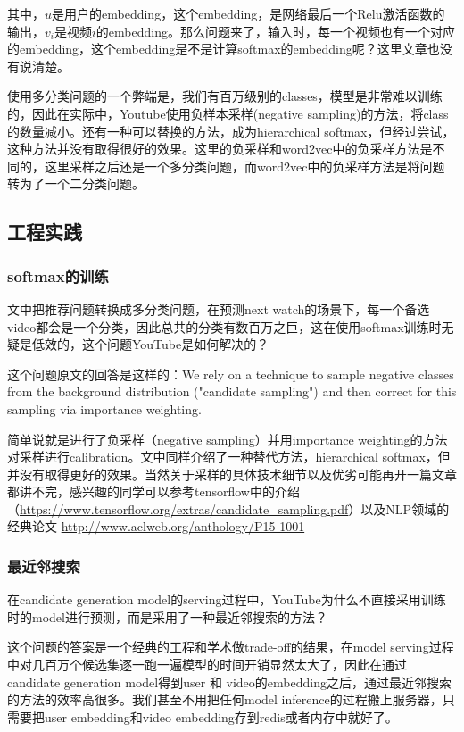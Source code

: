 \documentclass[12pt]{article}
\begin{document}
其中，$u$是用户的embedding，这个embedding，是网络最后一个Relu激活函数的输出，$v_i$是视频$i$的embedding。那么问题来了，输入时，每一个视频也有一个对应的embedding，这个embedding是不是计算softmax的embedding呢？这里文章也没有说清楚。

使用多分类问题的一个弊端是，我们有百万级别的classes，模型是非常难以训练的，因此在实际中，Youtube使用负样本采样(negative sampling)的方法，将class的数量减小。还有一种可以替换的方法，成为hierarchical softmax，但经过尝试，这种方法并没有取得很好的效果。这里的负采样和word2vec中的负采样方法是不同的，这里采样之后还是一个多分类问题，而word2vec中的负采样方法是将问题转为了一个二分类问题。

\subsection{工程实践}
\subsubsection{softmax的训练}
文中把推荐问题转换成多分类问题，在预测next watch的场景下，每一个备选video都会是一个分类，因此总共的分类有数百万之巨，这在使用softmax训练时无疑是低效的，这个问题YouTube是如何解决的？

这个问题原文的回答是这样的：We rely on a technique to sample negative classes from the background distribution ("candidate sampling") and then correct for this sampling via importance weighting.

简单说就是进行了负采样（negative sampling）并用importance weighting的方法对采样进行calibration。文中同样介绍了一种替代方法，hierarchical softmax，但并没有取得更好的效果。当然关于采样的具体技术细节以及优劣可能再开一篇文章都讲不完，感兴趣的同学可以参考tensorflow中的介绍（\url{https://www.tensorflow.org/extras/candidate_sampling.pdf}）以及NLP领域的经典论文 \url{http://www.aclweb.org/anthology/P15-1001}

\subsubsection{最近邻搜索}
在candidate generation model的serving过程中，YouTube为什么不直接采用训练时的model进行预测，而是采用了一种最近邻搜索的方法？

这个问题的答案是一个经典的工程和学术做trade-off的结果，在model serving过程中对几百万个候选集逐一跑一遍模型的时间开销显然太大了，因此在通过candidate generation model得到user 和 video的embedding之后，通过最近邻搜索的方法的效率高很多。我们甚至不用把任何model inference的过程搬上服务器，只需要把user embedding和video embedding存到redis或者内存中就好了。
\end{document}
